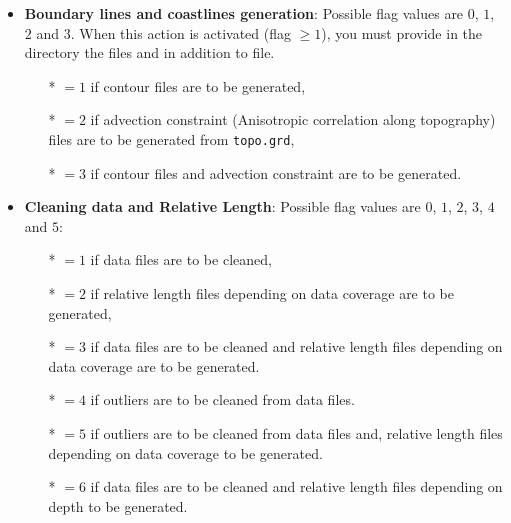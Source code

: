 \begin{itemize}

\item {\bf Boundary lines and coastlines generation}: Possible flag values are $0$, $1$, $2$ and $3$. When this action is activated (flag $\geq 1$), you must provide in the  directory the files  and   in addition to  file.
              \begin{itemize}
                \item[*] $=1$ if contour files are to be generated,
                \item[*] $=2$ if advection constraint (Anisotropic correlation along topography) files are to be generated from  \texttt{topo.grd},
                \item[*] $=3$ if contour files and advection constraint are to be generated.
              \end{itemize}

\item {\bf Cleaning data and Relative Length}: Possible flag values are $0$, $1$, $2$, $3$, $4$ and $5$:
              \begin{itemize}
                \item[*] $=1$ if data files are to be cleaned,
                \item[*] $=2$ if relative length files depending on data coverage are to be generated,
                \item[*] $=3$ if data files are to be cleaned and relative length files depending on data coverage are to be generated.
                \item[*] $=4$ if outliers are to be cleaned from data files.
                \item[*] $=5$ if outliers are to be cleaned from data files and, relative length files depending on data coverage to be generated.
                \item[*] $=6$ if data files are to be cleaned and relative length files depending on depth to be generated.
              \end{itemize}


\end{itemize}
